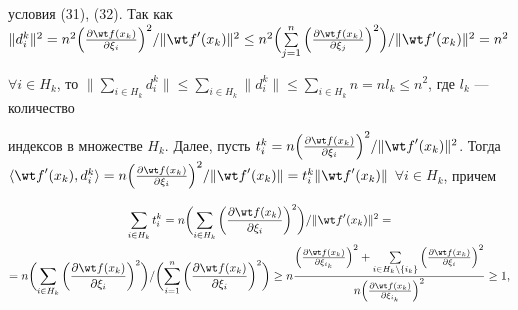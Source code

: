 условия (31), (32). Так как $\|{d_i^k}\|^2=n^2 


\Big({\frac{\partial\wt f(x_k)}{\partial\xi_i}}\Big)^2/ 


\|{{\wt f}'(x_k)}\|^2\le n^2\Big({\sum\limits_{j=1}


^{n}\Big({\frac{\partial\wt f(x_k)}{\partial\xi_j}}


\Big)^2}\Big)/\|{{\wt f}'(x_k)}\|^2=n^2$


$\forall i\in H_k$, то $\Big\|{\sum\limits_{i\in H_k}d_i^k}


\Big\|\le\sum\limits_{i\in H_k}\|{d_i^k}\|\le


\sum\limits_{i\in H_k}n=nl_k\le n^2$, где $l_k$ --- количество


индексов в множестве $H_k$. Далее, пусть $t_i^k=n\Big({\frac{


\partial\wt f(x_k)}{\partial\xi_i}}\Big)^2/\|


{{\wt f}'(x_k)}\|^2$. Тогда $\langle {{\wt f}'(x_k),d_i^


k}\rangle =n\Big({\frac{\partial\wt f(x_k)}{\partial\xi_i}


}\Big)^2/\|{{\wt f}'(x_k)}\|=t_i^k\|


{{\wt f}'(x_k)}\|$ $\forall i\in H_k$, причем


\begin{multline*}


\sum_{i\in H_k}t_i^k=n\bigg({\sum_{i\in H_k}\bigg(


{\frac{\partial\wt f(x_k)}{\partial\xi_i}}\bigg)^2}


\bigg) /\|{{\wt f}'(x_k)}\|^2=\\


%


=n\bigg({\sum_{i\in H_k}\bigg({\frac{\partial\wt


f(x_k)}{\partial\xi_i}}\bigg)^2}\bigg) /


\bigg({\sum_{i=1}^{n}\bigg({\frac{\partial\wt f(x_k)}{\partial\xi_i}}


\bigg)^2}\bigg)\ge


n\frac{\Big({\frac{\partial\wt f(x_k)}{\partial\xi_{i_k}}}\Big)^2+


\sum\limits_{i\in H_k\setminus\{{i_k}\}}


\Big({\frac{\partial\wt f(x_k)}{\partial\xi_i}}\Big)^2}{


n\Big({\frac{\partial\wt f(x_k)}{\partial\xi_{i_k}}}\Big)^2}\ge 1,


\end{multline*}


